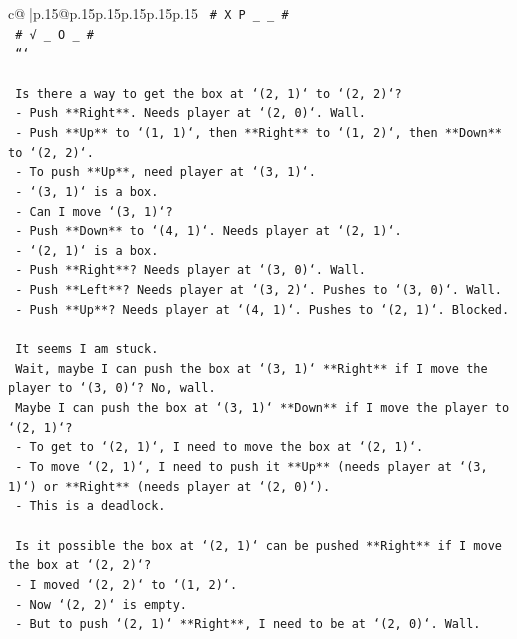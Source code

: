 \documentclass{article}
\begin{document}
{\begin{supertabular}{c@{$\;$}|p{.15\linewidth}@{}p{.15\linewidth}p{.15\linewidth}p{.15\linewidth}p{.15\linewidth}p{.15\linewidth}}
{{{\texttt{   \# X P \_ \_ \#} \\
\texttt{   \# √ \_ O \_ \#} \\
\texttt{   ```} \\
\\ 
\texttt{   Is there a way to get the box at `(2, 1)` to `(2, 2)`?} \\
\texttt{   {-} Push **Right**. Needs player at `(2, 0)`. Wall.} \\
\texttt{   {-} Push **Up** to `(1, 1)`, then **Right** to `(1, 2)`, then **Down** to `(2, 2)`.} \\
\texttt{     {-} To push **Up**, need player at `(3, 1)`.} \\
\texttt{     {-} `(3, 1)` is a box.} \\
\texttt{     {-} Can I move `(3, 1)`?} \\
\texttt{       {-} Push **Down** to `(4, 1)`. Needs player at `(2, 1)`.} \\
\texttt{       {-} `(2, 1)` is a box.} \\
\texttt{       {-} Push **Right**? Needs player at `(3, 0)`. Wall.} \\
\texttt{       {-} Push **Left**? Needs player at `(3, 2)`. Pushes to `(3, 0)`. Wall.} \\
\texttt{       {-} Push **Up**? Needs player at `(4, 1)`. Pushes to `(2, 1)`. Blocked.} \\
\\ 
\texttt{   It seems I am stuck.} \\
\texttt{   Wait, maybe I can push the box at `(3, 1)` **Right** if I move the player to `(3, 0)`? No, wall.} \\
\texttt{   Maybe I can push the box at `(3, 1)` **Down** if I move the player to `(2, 1)`?} \\
\texttt{   {-} To get to `(2, 1)`, I need to move the box at `(2, 1)`.} \\
\texttt{   {-} To move `(2, 1)`, I need to push it **Up** (needs player at `(3, 1)`) or **Right** (needs player at `(2, 0)`).} \\
\texttt{   {-} This is a deadlock.} \\
\\ 
\texttt{   Is it possible the box at `(2, 1)` can be pushed **Right** if I move the box at `(2, 2)`?} \\
\texttt{   {-} I moved `(2, 2)` to `(1, 2)`.} \\
\texttt{   {-} Now `(2, 2)` is empty.} \\
\texttt{   {-} But to push `(2, 1)` **Right**, I need to be at `(2, 0)`. Wall.} \\
}}}
\end{supertabular}}
\end{document}
